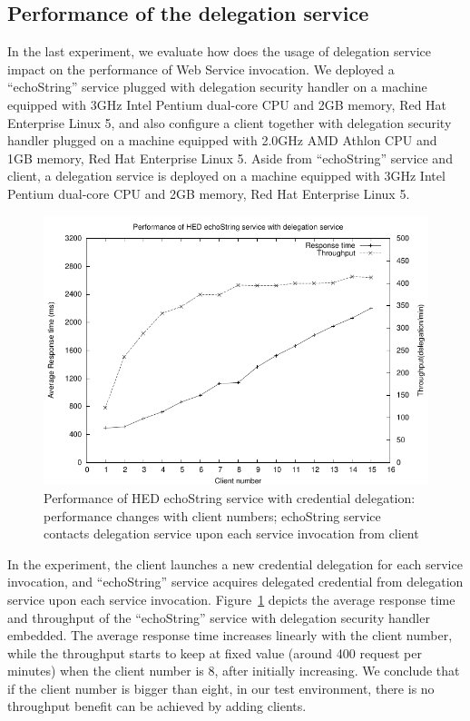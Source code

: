 \documentclass[conference]{IEEEtran}
\begin{document}
\subsection{Performance of the delegation service}
\label{sec:perfdelegserv}

In the last experiment, we evaluate how does the usage of delegation service
impact on the performance of Web Service invocation. We deployed a ``echoString'' service
plugged with delegation security handler on a machine equipped with 3GHz Intel Pentium dual-core CPU and
2GB memory, Red Hat Enterprise Linux 5, and also configure a client together with delegation
security handler plugged on a machine equipped with 2.0GHz AMD Athlon CPU and 1GB memory, Red Hat
Enterprise Linux 5. Aside from ``echoString'' service and client, a delegation service is deployed on a machine
equipped with 3GHz Intel Pentium dual-core CPU and 2GB memory, Red Hat Enterprise Linux 5.

\begin{figure}
\includegraphics[width=0.9\columnwidth]{Delegation_thread_to_perf.pdf}
\caption{Performance of HED echoString service with credential delegation:
performance changes with client numbers; echoString service contacts delegation service upon
each service invocation from client}
\label{fig:Delegation_thread_to_perf}
\end{figure}

In the experiment, the client launches a new credential delegation for each
service invocation, and ``echoString'' service acquires delegated credential from delegation service
upon each service invocation.
Figure~\ref{fig:Delegation_thread_to_perf} depicts the average response time and
throughput of the ``echoString'' service with delegation security handler embedded. The
average response time increases linearly with the client number, while the throughput starts to keep at
fixed value (around 400 request per minutes) when the client number is 8, after initially
increasing.
We conclude that if the client number is bigger than eight, in our test
environment, there is no throughput benefit can be achieved by adding clients.
\end{document}
